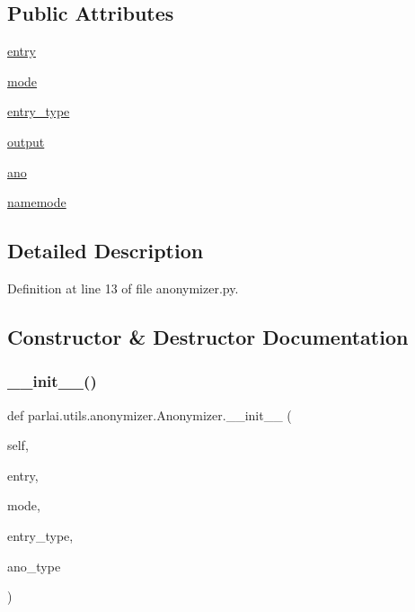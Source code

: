 \subsection*{Public Attributes}
\begin{DoxyCompactItemize}
\item 
\hyperlink{classparlai_1_1utils_1_1anonymizer_1_1Anonymizer_a348d1fd062fa3f57ad81cce32e8dd2c7}{entry}
\item 
\hyperlink{classparlai_1_1utils_1_1anonymizer_1_1Anonymizer_a535b959cd821885d5af2831644cde735}{mode}
\item 
\hyperlink{classparlai_1_1utils_1_1anonymizer_1_1Anonymizer_a11c56824a15faa979c46dde2422a4a78}{entry\+\_\+type}
\item 
\hyperlink{classparlai_1_1utils_1_1anonymizer_1_1Anonymizer_a79c7f73d9f30bdf77d4274357272ca5e}{output}
\item 
\hyperlink{classparlai_1_1utils_1_1anonymizer_1_1Anonymizer_a93524d9b3d82d5cd637272cdf1dc816a}{ano}
\item 
\hyperlink{classparlai_1_1utils_1_1anonymizer_1_1Anonymizer_a1ebf22dc33a47f4a6f6a6833cdfe32f5}{namemode}
\end{DoxyCompactItemize}


\subsection{Detailed Description}


Definition at line 13 of file anonymizer.\+py.



\subsection{Constructor \& Destructor Documentation}
\mbox{\label{classparlai_1_1utils_1_1anonymizer_1_1Anonymizer_abb5227ee9a889aff79a0c657c76ffd71}} 
\subsubsection{\texorpdfstring{\+\_\+\+\_\+init\+\_\+\+\_\+()}{\_\_init\_\_()}}
{\footnotesize\ttfamily def parlai.\+utils.\+anonymizer.\+Anonymizer.\+\_\+\+\_\+init\+\_\+\+\_\+ (\begin{DoxyParamCaption}\item[{}]{self,  }\item[{}]{entry,  }\item[{}]{mode,  }\item[{}]{entry\+\_\+type,  }\item[{}]{ano\+\_\+type }\end{DoxyParamCaption})}



